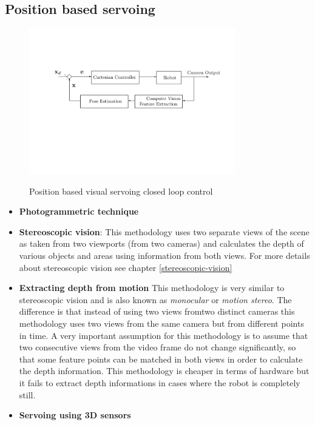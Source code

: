 \subsection{Position based servoing}

\begin{center}
\begin{figure}[!htb]
\centering
\includegraphics[width=0.8\textwidth]{images/visual-servoing-position-based.png}\\
\caption{Position based visual servoing closed loop control}
\end{figure}
\end{center}

\begin{itemize}
\item \textbf{Photogrammetric technique}
\item \textbf{Stereoscopic vision}: This methodology uses two separate views of the scene as taken from two viewports (from two cameras) 
and calculates the depth of various objects and areas using information from both views. For more details about stereoscopic vision see chapter \ref{stereoscopic-vision}
\item \textbf{Extracting depth from motion} This methodology is very similar to stereoscopic vision and is also known as \textit{monocular} or \textit{motion stereo}. The difference is that instead of using two views fromtwo distinct cameras this methodology 
uses two views from the same camera but from different points in time. A very important assumption for this methodology is to assume that two consecutive views from the video frame do not change significantly, so that some feature points can be matched in both views in order to calculate the depth information. This methodology 
is cheaper in terms of hardware but it fails to extract depth informations in cases where the robot is completely still.
\item \textbf{Servoing using 3D sensors}
\end{itemize}

